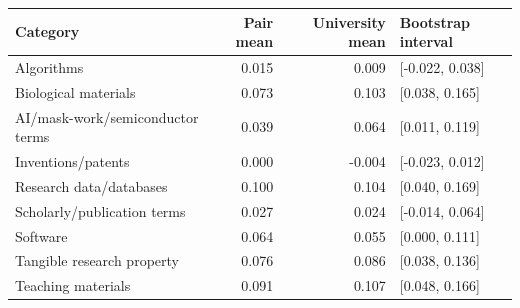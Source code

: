 \begin{tabular}{lrrl}
\toprule
Category & Pair mean & University mean & Bootstrap interval \\
\midrule
Algorithms & 0.015 & 0.009 & [-0.022, 0.038] \\
Biological materials & 0.073 & 0.103 & [0.038, 0.165] \\
AI/mask-work/semiconductor terms & 0.039 & 0.064 & [0.011, 0.119] \\
Inventions/patents & 0.000 & -0.004 & [-0.023, 0.012] \\
Research data/databases & 0.100 & 0.104 & [0.040, 0.169] \\
Scholarly/publication terms & 0.027 & 0.024 & [-0.014, 0.064] \\
Software & 0.064 & 0.055 & [0.000, 0.111] \\
Tangible research property & 0.076 & 0.086 & [0.038, 0.136] \\
Teaching materials & 0.091 & 0.107 & [0.048, 0.166] \\
\bottomrule
\end{tabular}
